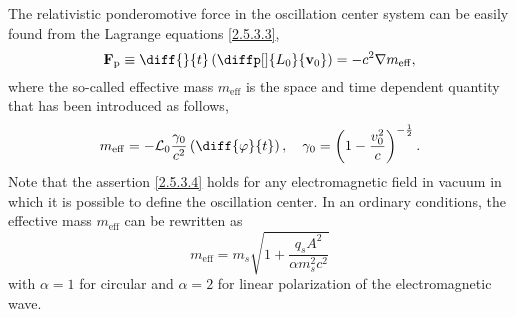 The relativistic ponderomotive force in the oscillation center system can be easily found from the Lagrange equations \ref{2.5.3.3},
\begin{equation}
\vec{F}_{\mathrm{p}} \equiv \diff{}{t} \left( \diffp[]{L_0}{\vec{v}_0} \right) = -c^2 \grad{m_{\mathrm{eff}}},
\end{equation}
where the so-called effective mass $ m_{\mathrm{eff}} $ is the space and time dependent quantity that has been introduced as follows,
\begin{equation}
\label{2.5.3.4}
m_{\mathrm{eff}} = - \mathcal{L}_0 \frac{\gamma_0}{c^2} \left( \diff{\varphi}{t} \right), \quad  \gamma_0 = \left(1 - \frac{v_0^{2}}{c} \right)^{-\frac{1}{2}}.
\end{equation}
Note that the assertion \ref{2.5.3.4} holds for any electromagnetic field in vacuum in which it is possible to define the oscillation center. In an ordinary conditions, the effective mass $ m_{\mathrm{eff}} $ can be rewritten as
\begin{equation}
m_{\mathrm{eff}} = m_s \sqrt{1 + \frac{q_s A^2}{\alpha m_s^2 c^2}}
\end{equation}
with $ \alpha = 1 $ for circular and $ \alpha = 2 $ for linear polarization of the electromagnetic wave. 